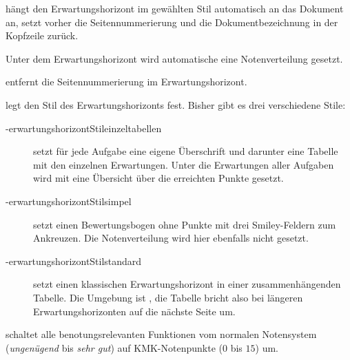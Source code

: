 \begin{options}
     hängt den Erwartungshorizont im gewählten Stil automatisch an das Dokument an, setzt vorher die Seitennummerierung und die Dokumentbezeichnung in der Kopfzeile zurück.

    Unter dem Erwartungshorizont wird automatische eine Notenverteilung gesetzt.


		 entfernt die Seitennummerierung im Erwartungshorizont.

         legt den Stil des Erwartungshorizonts fest.
        Bisher gibt es drei verschiedene Stile:
        \begin{description}
            \item[\keyis-{erwartungshorizontStil}{einzeltabellen}\space] setzt für jede Aufgabe eine eigene Überschrift und darunter eine Tabelle mit den einzelnen Erwartungen. Unter die Erwartungen aller Aufgaben wird mit  eine Übersicht über die erreichten Punkte gesetzt.


            \item[\keyis-{erwartungshorizontStil}{simpel}\space] setzt einen Bewertungsbogen ohne Punkte mit drei Smiley-Feldern zum Ankreuzen. Die Notenverteilung wird hier ebenfalls nicht gesetzt.


            \item[\keyis-{erwartungshorizontStil}{standard}\space] setzt einen klassischen Erwartungshorizont in einer zusammenhängenden Tabelle. Die Umgebung ist , die Tabelle bricht also bei längeren Erwartungshorizonten auf die nächste Seite um.

        \end{description}

     schaltet alle benotungsrelevanten Funktionen vom normalen Notensystem (\textit{ungenügend} bis \textit{sehr gut}) auf KMK-Notenpunkte ($0$ bis $15$) um.


\end{options}
